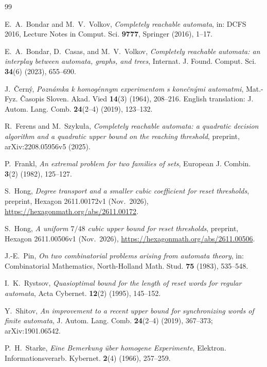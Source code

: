 \documentclass[11pt,a4paper]{article}
\theoremstyle{definition}
\theoremstyle{remark}
\begin{document}
\begin{thebibliography}{99}

E.~A.~Bondar and M.~V.~Volkov, \emph{Completely reachable automata}, in: DCFS 2016, Lecture Notes in Comput. Sci. \textbf{9777}, Springer (2016), 1--17.

E.~A.~Bondar, D.~Casas, and M.~V.~Volkov, \emph{Completely reachable automata: an interplay between automata, graphs, and trees}, Internat. J. Found. Comput. Sci. \textbf{34}(6) (2023), 655--690.

J.~\v{C}ern\'y, \emph{Pozn\'amka k homog\'ennym experimentom s kone\v{c}n\'ymi automatmi}, Mat.-Fyz. \v{C}asopis Sloven. Akad. Vied \textbf{14}(3) (1964), 208--216. English translation: J. Autom. Lang. Comb. \textbf{24}(2--4) (2019), 123--132.

R.~Ferens and M.~Szyku\l a, \emph{Completely reachable automata: a quadratic decision algorithm and a quadratic upper bound on the reaching threshold}, preprint, arXiv:2208.05956v5 (2025).

P.~Frankl, \emph{An extremal problem for two families of sets}, European J. Combin. \textbf{3}(2) (1982), 125--127.

S.~Hong, \emph{Degree transport and a smaller cubic coefficient for reset thresholds}, preprint, Hexagon 2611.00172v1 (Nov.\ 2026), \url{https://hexagonmath.org/abs/2611.00172}.

S.~Hong, \emph{A uniform $7/48$ cubic upper bound for reset thresholds}, preprint, Hexagon 2611.00506v1 (Nov.\ 2026), \url{https://hexagonmath.org/abs/2611.00506}.

J.-E.~Pin, \emph{On two combinatorial problems arising from automata theory}, in: Combinatorial Mathematics, North-Holland Math. Stud. \textbf{75} (1983), 535--548.

I.~K.~Rystsov, \emph{Quasioptimal bound for the length of reset words for regular automata}, Acta Cybernet. \textbf{12}(2) (1995), 145--152.

Y.~Shitov, \emph{An improvement to a recent upper bound for synchronizing words of finite automata}, J. Autom. Lang. Comb. \textbf{24}(2--4) (2019), 367--373; arXiv:1901.06542.

P.~H.~Starke, \emph{Eine Bemerkung \"uber homogene Experimente}, Elektron. Informationsverarb. Kybernet. \textbf{2}(4) (1966), 257--259.


\end{thebibliography}
\end{document}
